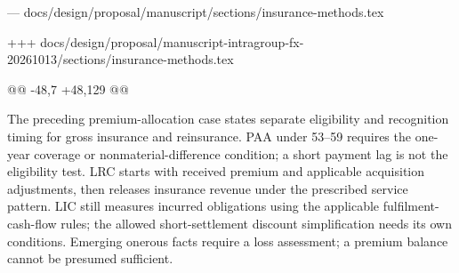 --- docs/design/proposal/manuscript/sections/insurance-methods.tex

+++ docs/design/proposal/manuscript-intragroup-fx-20261013/sections/insurance-methods.tex

@@ -48,7 +48,129 @@

 The preceding premium-allocation case states separate eligibility and recognition timing for gross insurance and reinsurance. PAA under 53--59 requires the one-year coverage or nonmaterial-difference condition; a short payment lag is not the eligibility test. LRC starts with received premium and applicable acquisition adjustments, then releases insurance revenue under the prescribed service pattern. LIC still measures incurred obligations using the applicable fulfilment-cash-flow rules; the allowed short-settlement discount simplification needs its own conditions. Emerging onerous facts require a loss assessment; a premium balance cannot be presumed sufficient.
 
